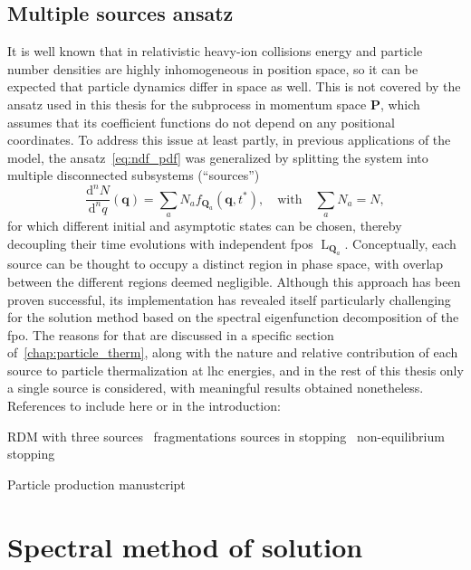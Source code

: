 \documentclass[a4paper,12pt]{book}
\begin{document}
\subsection{Multiple sources ansatz}
It is well known that in relativistic heavy-ion collisions energy and particle number densities are highly inhomogeneous in position space, so it can be expected that particle dynamics differ in space as well. This is not covered by the ansatz used in this thesis for the subprocess in momentum space $\bm{P}$, which assumes
that its coefficient functions do not depend on any positional coordinates. To address this issue at least partly, in previous applications of the model, the ansatz~\eqref{eq:ndf_pdf} was generalized by splitting the system into multiple disconnected subsystems (“sources”)~\parencite{Wolschin2006}
\begin{equation}
\label{eq:ndf_pdf_spurces}
   \frac{\mathrm{d}^nN}{\mathrm{d}^n q}(\bm{q}) = \sum_a N_a f_{\bm{Q}_a}(\bm{q},t^*), \quad \text{with} \quad \sum_a N_a = N,
\end{equation}
for which different initial and asymptotic states can be chosen, thereby decoupling their time evolutions with independent \acrshort{fpo}s $\operatorname{L}_{\bm{Q}_a}$. Conceptually, each source can be thought to occupy a distinct region in phase space, with overlap between the different regions deemed negligible. Although this approach has been proven successful, its implementation has revealed itself particularly challenging for the solution method based on the spectral eigenfunction decomposition of the \acrshort{fpo}. The reasons for that are discussed in a specific section of~\autoref{chap:particle_therm}, along with the nature and relative contribution of each source to particle thermalization at \acrshort{lhc} energies, and in the rest of this thesis only a single source is considered, with meaningful results obtained nonetheless. \\

References to include here or in the introduction: 


RDM with three sources~\parencite{Wolschin2015}
fragmentations sources in stopping~\parencite{Tani2009,Tani2009b}
non-equilibrium stopping~\parencite{Hoelck2020}

Particle production manustcript~\parencite{Hoelck2023}

\section{Spectral method of solution}
\end{document}
